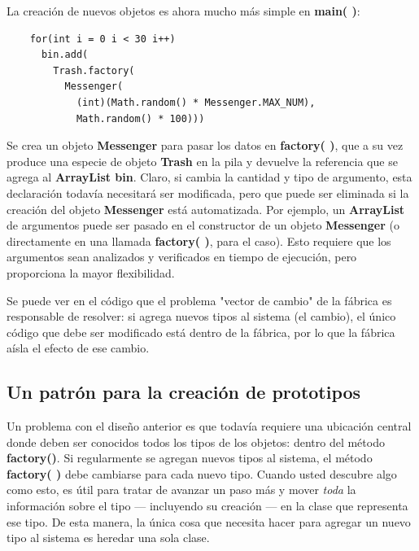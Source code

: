 \documentclass{article}
\begin{document}
La creación de nuevos objetos es ahora mucho más simple en \textbf{main( )}:    \newline

\begin{lstlisting} 
    for(int i = 0 i < 30 i++) 
      bin.add( 
        Trash.factory( 
          Messenger( 
            (int)(Math.random() * Messenger.MAX_NUM), 
            Math.random() * 100))) 
\end{lstlisting}

Se crea un objeto \textbf{Messenger} para pasar los datos en \textbf{factory( )},
que a su vez produce una especie de objeto \textbf{Trash} en la pila y devuelve la referencia que se agrega al \textbf{ArrayList bin}. Claro, si cambia la cantidad y tipo de argumento, esta declaración todavía necesitará ser modificada, pero que puede ser eliminada si la creación del objeto \textbf{Messenger} está automatizada. Por ejemplo, un \textbf{ArrayList} de argumentos puede ser pasado en el constructor de un objeto \textbf{Messenger} (o directamente en una llamada \textbf{factory( )}, para el caso). Esto requiere que los argumentos sean analizados y verificados en tiempo de ejecución, pero proporciona la mayor flexibilidad.    \newline

Se puede ver en el código que el problema "vector de cambio" de la fábrica es responsable de resolver: si agrega nuevos tipos al sistema (el cambio), el único código que debe ser modificado está dentro de la fábrica, por lo que la fábrica aísla el efecto de ese cambio. \newline

\subsection{Un patrón para la creación de prototipos}

Un problema con el diseño anterior es que todavía requiere una ubicación central donde deben ser conocidos todos los tipos de los objetos: dentro del método \textbf{factory()}. Si regularmente se agregan nuevos tipos al sistema, el método \textbf{factory( )} debe cambiarse para cada nuevo tipo. Cuando usted descubre algo como esto, es útil para tratar de avanzar un paso más y mover \textit{toda} la información sobre el tipo — incluyendo su creación — en la clase que representa ese tipo. De esta manera, la única cosa que necesita hacer para agregar un nuevo tipo al sistema es heredar una sola clase.   \newline
\end{document}

